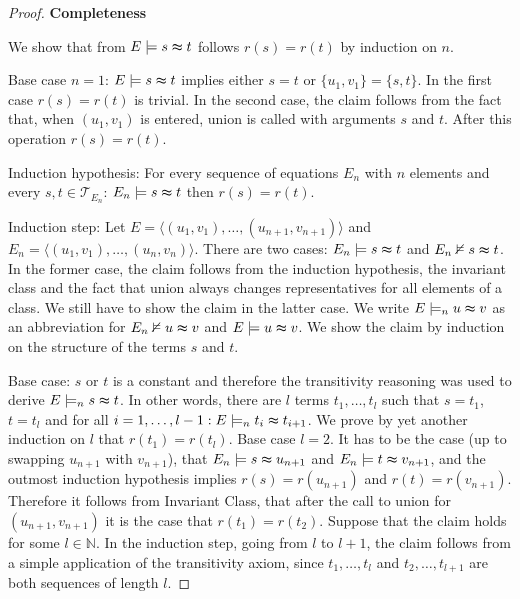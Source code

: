 \begin{proof}

\textbf{Completeness}

We show that from $E \models s \thickapprox t$ follows $r(s) = r(t)$ by induction on $n$.

Base case $n=1$: $E \models s \thickapprox t$ implies either $s = t$ or $\{u_1,v_1\} = \{s,t\}$.
In the first case $r(s) = r(t)$ is trivial. 
In the second case, the claim follows from the fact that, when $(u_1,v_1)$ is entered, union is called with arguments $s$ and $t$.
After this operation $r(s) = r(t)$.

Induction hypothesis: For every sequence of equations $E_n$ with $n$ elements and every $s,t \in \mathcal{T}_{E_n}$: $E_n \models s \thickapprox t$ then $r(s) = r(t)$.

Induction step: Let $E = \langle (u_1,v_1), \ldots, (u_{n+1},v_{n+1}) \rangle$ and $E_n = \langle (u_1,v_1), \ldots, (u_n,v_n) \rangle$.
There are two cases: $E_n \models s\thickapprox t$ and $E_n \nvDash s\thickapprox t$.
In the former case, the claim follows from the induction hypothesis, the invariant class and the fact that union always changes representatives for all elements of a class.
We still have to show the claim in the latter case.
We write $E \models_n u \thickapprox v$ as an abbreviation for $E_n \nvDash u \thickapprox v$ and $E \models u \thickapprox v$.
We show the claim by induction on the structure of the terms $s$ and $t$.

Base case: $s$ or $t$ is a constant and therefore the transitivity reasoning was used to derive $E \models_n s \thickapprox t$.
In other words, there are $l$ terms $t_1,\ldots,t_l$ such that $s = t_1$, $t = t_l$ and for all $i = 1,\ldots,l-1: E \models_n t_i \thickapprox t_{i+1}$.
We prove by yet another induction on $l$ that $r(t_1) = r(t_l)$.
Base case $l = 2$. It has to be the case (up to swapping $u_{n+1}$ with $v_{n+1}$), that $E_n \models s \thickapprox u_{n+1}$ and $E_n \models t \thickapprox v_{n+1}$, and the outmost induction hypothesis implies $r(s) = r(u_{n+1})$ and $r(t) = r(v_{n+1})$.
Therefore it follows from Invariant Class, that after the call to union for $(u_{n+1},v_{n+1})$ it is the case that $r(t_1) = r(t_2)$.
Suppose that the claim holds for some $l \in \mathbb{N}$.
In the induction step, going from $l$ to $l+1$, the claim follows from a simple application of the transitivity axiom, since $t_1,\ldots,t_l$ and $t_2,\ldots,t_{l+1}$ are both sequences of length $l$.


\end{proof}
